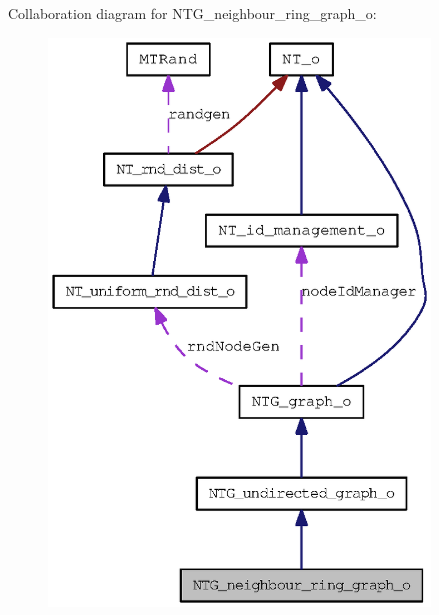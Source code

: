 Collaboration diagram for NTG\_\-neighbour\_\-ring\_\-graph\_\-o:
\nopagebreak
\begin{figure}[H]
\begin{center}
\leavevmode
\includegraphics[width=287pt]{class_n_t_g__neighbour__ring__graph__o__coll__graph}
\end{center}
\end{figure}
